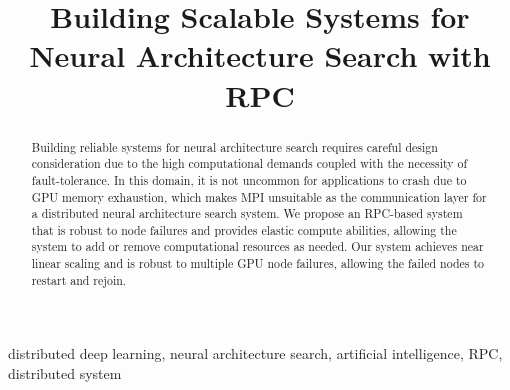 \documentclass[conference]{IEEEtran}
\begin{document}
\title{Building Scalable Systems for Neural Architecture Search with RPC}

\author{
\and
{}
}

\maketitle

\begin{abstract}
  Building reliable systems for neural architecture search requires careful
  design consideration due to the high computational demands coupled with the
  necessity of fault-tolerance. In this domain, it is not uncommon for
  applications to crash due to GPU memory exhaustion, which makes MPI unsuitable
  as the communication layer for a distributed neural architecture search
  system. We propose an RPC-based system that is robust
  to node failures and provides elastic compute abilities, allowing the system
  to add or remove computational resources as needed.  Our system achieves near
  linear scaling and is robust to multiple GPU node failures, allowing the
  failed nodes to restart and rejoin.
\end{abstract}

\begin{IEEEkeywords}
  distributed deep learning, neural architecture search, artificial intelligence,
  RPC, distributed system
\end{IEEEkeywords}
\end{document}
